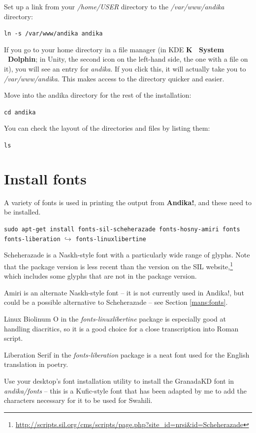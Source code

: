 \documentclass[a4paper,10pt, oneside]{book}
\begin{document}
Set up a link from your \textit{/home/USER} directory to the \textit{/var/www/andika} directory:

\verb|ln -s /var/www/andika andika|

If you go to your home directory in a file manager (in KDE \textbf{K \textrightarrow\ System \textrightarrow\ Dolphin}; in Unity, the second icon on the left-hand side, the one with a file on it), you will see an entry for \textit{andika}.  If you click this, it will actually take you to \textit{/var/www/andika}.  This makes access to the directory quicker and easier.

Move into the andika directory for the rest of the installation:

\verb|cd andika|

You can check the layout of the directories and files by listing them:

\verb|ls|


\section{Install fonts}
\label{s:fonts}

A variety of fonts is used in printing the output from \textbf{Andika!}, and these need to be installed.

\verb|sudo apt-get install fonts-sil-scheherazade fonts-hosny-amiri fonts fonts-liberation|
$\hookrightarrow$ \verb|fonts-linuxlibertine|

Scheherazade is a Naskh-style font with a particularly wide range of glyphs.  Note that the package version is less recent than the version on the SIL website,\footnote{\url{http://scripts.sil.org/cms/scripts/page.php?site_id=nrsi&id=Scheherazade}} which includes some glyphs that are not in the package version.

Amiri is an alternate Naskh-style font -- it is not currently used in Andika!, but could be a possible alternative to Scheherazade -- see Section \ref{mans:fonts}.

Linux Biolinum O in the \textit{fonts-linuxlibertine} package is especially good at handling diacritics, so it is a good choice for a close transcription into Roman script.

Liberation Serif in the \textit{fonts-liberation} package is a neat font used for the English translation in poetry.

Use your desktop's font installation utility to install the GranadaKD font in \textit{andika/fonts} -- this is a Kufic-style font that has been adapted by me to add the characters necessary for it to be used for Swahili.
\end{document}
